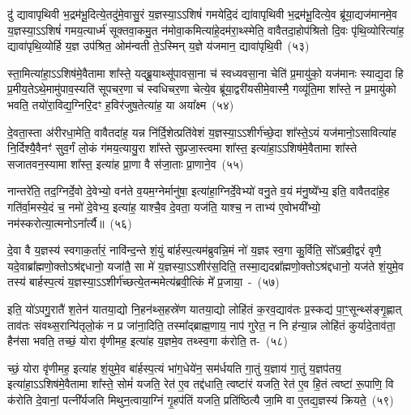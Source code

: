 दु॑ द्यावापृथिवी भ॒द्रम॑भू॒दित्ये॒तदु॑मे॒वासु॒रं य॒ज्ञस्या॒\-ऽऽ\-शिषं॑ गमयेदि॒दं द्या॑वापृथिवी भ॒द्रम॑भू॒दित्ये॒व ब्रू॑या॒द्यज॑मानमे॒व य॒ज्ञस्या॒\-ऽऽ\-शिषं॑ गमय॒त्यार्ध्म॑ सूक्तवा॒कमु॒त न॑मोवा॒कमित्या॑\-हे॒दम॑रा॒थ्स्मेति॒ वावैतदा॒होप॑श्रितो दि॒वः पृ॑थि॒व्योरित्या॑ह॒ द्यावा॑पृथि॒व्योर्\mbox{}हि य॒ज्ञ उप॑श्रित॒ ओम॑न्वती ते॒\-ऽस्मिन् य॒ज्ञे य॑जमान॒ द्यावा॑\-पृथि॒वी~(५३)

स्ता॒मित्या॑हा॒\-ऽऽ\-शिष॑मे॒वैतामा शा᳚स्ते॒ यद्ब्रू॒याथ्सू॑पावसा॒ना च॑ स्वध्यवसा॒ना चेति॑ प्र॒मायु॑को॒ यज॑मानः स्याद्य॒दा हि प्र॒मीय॒ते\-ऽथे॒मामु॑पाव॒स्यति॑ सूपचर॒णा च॑ स्वधिचर॒णा चेत्ये॒व ब्रू॑या॒द्वरी॑यसीमे॒वास्मै॒ गव्यू॑ति॒मा शा᳚स्ते॒ न प्र॒मायु॑को भवति॒ तयो॑रा॒विद्य॒ग्निरि॒दꣳ ह॒विर॑जुष॒तेत्या॑ह॒ या अया᳚क्ष्म~(५४)

दे॒वता॒स्ता अ॑रीरधा॒मेति॒ वावैतदा॑ह॒ यन्न नि॑र्दि॒शेत्प्रति॑वेशं य॒ज्ञस्या॒\-ऽऽ\-शीर्ग॑च्छे॒दा शा᳚स्ते॒\-ऽयं यज॑मानो॒\-ऽसावित्या॑ह नि॒र्दिश्यै॒वैनꣳ॑ सुव॒र्गं लो॒कं ग॑मय॒त्यायु॒रा शा᳚स्ते सुप्रजा॒स्त्वमा शा᳚स्त॒ इत्या॑हा॒\-ऽऽ\-शिष॑मे॒वैतामा शा᳚स्ते सजातवन॒स्यामा शा᳚स्त॒ इत्या॑ह प्रा॒णा वै स॑जा॒ताः प्रा॒णाने॒व~(५५)

नान्तरे॑ति॒ तद॒ग्निर्दे॒वो दे॒वेभ्यो॒ वन॑ते व॒यम॒ग्नेर्मानु॑षा॒ इत्या॑हा॒ग्निर्दे॒वेभ्यो॑ वनु॒ते व॒यं म॑नु॒ष्ये᳚भ्य॒ इति॒ वावैतदा॑हे॒ह गति॑र्वा॒मस्ये॒दं च॒ नमो॑ दे॒वेभ्य॒ इत्या॑ह॒ याश्चै॒व दे॒वता॒ यज॑ति॒ याश्च॒ न ताभ्य॑ ए॒वोभयी᳚भ्यो॒ नम॑स्करोत्या॒त्मनो\-ऽना᳚र्त्यै॥~(५६)

{\anuvakamend[{श्रि॒तस्ते॒ प्र त्रि॒ष्टुभ॑मे॒तद्द्यावा॑\-पृथि॒वी या अया᳚क्ष्म प्रा॒णाने॒व षट्च॑त्वारिꣳशच्च}]}%

दे॒वा वै य॒ज्ञस्य॑ स्वगाक॒र्तारं॒ नावि॑न्द॒न्ते शं॒युं बा॑र्\mbox{}हस्प॒त्य\-म॑ब्रुवन्नि॒मं नो॑ य॒ज्ञꣴ स्व॒गा कु॒र्विति॒ सो᳚\-ऽब्रवी॒द्वरं॑ वृणै॒ यदे॒वा\-ब्रा᳚ह्मणो॒क्तो\-ऽश्र॑द्दधानो॒ यजा॑तै॒ सा मे॑ य॒ज्ञस्या॒\-ऽऽ\-शीर॑स॒दिति॒ तस्मा॒द्यदब्रा᳚ह्मणो॒क्तो\-ऽश्र॑द्दधानो॒ यज॑ते शं॒युमे॒व तस्य॑ बार्\mbox{}हस्प॒त्यं य॒ज्ञस्या॒\-ऽऽ\-शीर्ग॑च्छ\-त्ये॒तन्ममेत्य॑ब्रवी॒त्किं मे᳚ प्र॒जाया॒~-~(५७)

इति॒ यो॑\-ऽपगु॒रातै॑ श॒तेन॑ यातया॒द्यो नि॒हन॑थ्स॒हस्रे॑ण यातया॒द्यो लोहि॑तं क॒रव॒द्याव॑तः प्र॒स्कद्य॑ पा॒ꣳ॒सून्थ्स॑ङ्गृ॒ह्णात् ताव॑तः संवथ्स॒रान्पि॑तृलो॒कं न प्र जा॑ना॒दिति॒ तस्मा᳚द्ब्राह्म॒णाय॒ नाप॑ गुरेत॒ न नि ह॑न्या॒न्न लोहि॑तं कुर्यादे॒ताव॑ता॒ हैन॑सा भवति॒ तच्छं॒ योरा वृ॑णीमह॒ इत्या॑ह य॒ज्ञमे॒व तथ्स्व॒गा क॑रोति॒ त-~(५८)

च्छं॒ योरा वृ॑णीमह॒ इत्या॑ह शं॒युमे॒व बा॑र्\mbox{}हस्प॒त्यं भा॑ग॒धेये॑न॒ सम॑र्धयति गा॒तुं य॒ज्ञाय॑ गा॒तुं य॒ज्ञप॑तय॒ इत्या॑हा॒\-ऽऽ\-शिष॑मे॒वैतामा शा᳚स्ते॒ सोमं॑ यजति॒ रेत॑ ए॒व तद्द॑धाति॒ त्वष्टा॑रं यजति॒ रेत॑ ए॒व हि॒तं त्वष्टा॑ रू॒पाणि॒ वि क॑रोति दे॒वानां॒ पत्नी᳚र्यजति मिथुन॒त्वाया॒ग्निं गृ॒हप॑तिं यजति॒ प्रति॑ष्ठित्यै जा॒मि वा ए॒तद्य॒ज्ञस्य॑ क्रियते॒~(५९)

